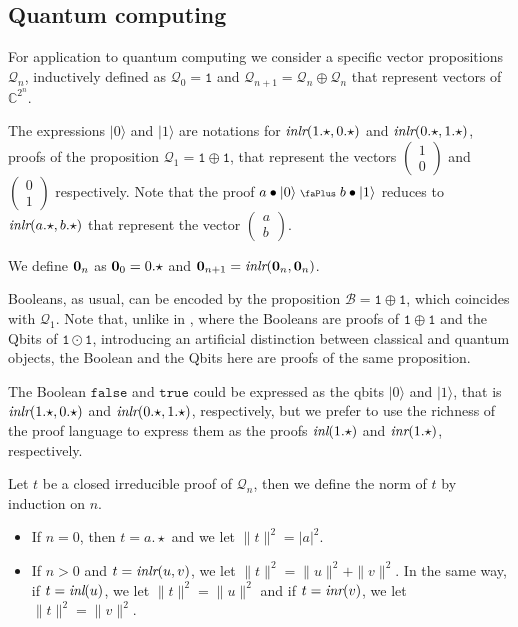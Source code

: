 \documentclass[screen, sigconf,authorversion,nonacm]{acmart}
\theoremstyle{acmdefinition}
\numberwithin{equation}{section}
\newcommand\ket[1]{\ensuremath{|{#1}\rangle}}
\newcommand\inl{\mbox{\it inl}}
\newcommand\inr{\mbox{\it inr}}
\newcommand\inlr{\mbox{\it inlr}}
\newcommand\plus{\mathrel{\text{\normalfont\scalebox{0.7}{\faPlus}}}}
\newcommand\Q{{\mathcal Q}}
\newcommand\B{{\mathcal B}}
\newcommand\boolzero{{\mathtt{false}}}
\newcommand\boolone{{\mathtt{true}}}
\newcommand\one{\ensuremath{\mathtt 1}}
\begin{document}
\subsection{Quantum computing}
\label{sec:quantumcomputing}

For application to quantum computing we consider a specific vector
propositions $\Q_n$, inductively defined as $\Q_0 = \one$ and
$\Q_{n+1} = \Q_n \oplus \Q_n$ that represent vectors of ${\mathbb
  C}^{2^n}$.

The expressions $\ket 0$ and $\ket 1$ are notations for 
$\inlr(1.\star,0.\star)$ and $\inlr(0.\star,1.\star)$, proofs of the
proposition $\Q_1 = \one \oplus \one$, that represent the vectors
$\left(\begin{smallmatrix}1\\0\end{smallmatrix}\right)$ and
$\left(\begin{smallmatrix}0\\1\end{smallmatrix}\right)$
respectively.  Note that the proof $a \bullet \ket 0 \plus b \bullet
\ket 1$ reduces to $\inlr(a.\star,b.\star)$ that represent the vector
$\left(\begin{smallmatrix}a\\b\end{smallmatrix}\right)$.

We define ${\bf 0}_n$ as ${\bf 0}_0 = 0.\star$ and ${\bf 0}_{n+1} =
\inlr({\bf 0}_n,{\bf 0}_n)$.

Booleans, as usual, can be encoded by the proposition
$\B=\one\oplus\one$, which coincides with $\Q_1$.  Note that, unlike
in \cite{DiazcaroDowekTCS23,DiazcaroDowekMSCS24}, where the Booleans
are proofs of $\one \oplus \one$ and the Qbits of $\one \odot \one$,
introducing an artificial distinction between classical and quantum
objects, the Boolean and the Qbits here are proofs of the same
proposition.

The Boolean $\boolzero$ and $\boolone$ could be expressed as the qbits
$\ket 0$ and $\ket 1$, that is $\inlr(1.\star, 0.\star)$ and
$\inlr(0.\star,1.\star)$, respectively, but we prefer to use the
richness of the proof language to express them as the proofs
$\inl(1.\star)$ and $\inr(1.\star)$, respectively.

\begin{definition}[Norm]
Let $t$ be a closed irreducible proof of $\Q_n$, then
we define the norm of $t$ by induction on $n$.
\begin{itemize}
\item If $n = 0$, then $t = a.\star$ and we let $\|t\|^2 = |a|^2$.

\item If $n > 0$ and $t = \inlr(u,v)$, we let $\|t\|^2 = \|u\|^2 +
  \|v\|^2$. In the same way, if $t = \inl(u)$, we let $\|t\|^2 =
  \|u\|^2$ and if $t = \inr(v)$, we let $\|t\|^2 = \|v\|^2$.
\end{itemize}
\end{definition}
\end{document}
